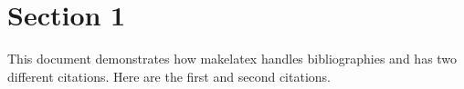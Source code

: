 \documentclass[letterpaper,12pt]{article}
\begin{document}
\section{Section 1}


This document demonstrates how makelatex handles bibliographies and has two different citations. Here are the first \cite{chicago} and second \cite{latexbook} citations.

\lipsum[1-3]




\end{document}
